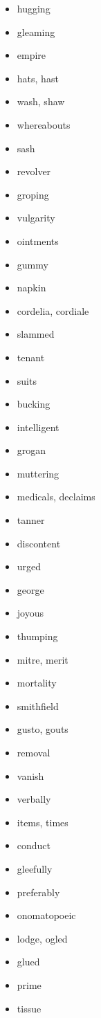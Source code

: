\documentclass{article}
\begin{document}
\begin{itemize}
    \item hugging
    \item gleaming
    \item empire
    \item hats, hast
    \item wash, shaw
    \item whereabouts
    \item sash
    \item revolver
    \item groping
    \item vulgarity
    \item ointments
    \item gummy
    \item napkin
    \item cordelia, cordiale
    \item slammed
    \item tenant
    \item suits
    \item bucking
    \item intelligent
    \item grogan
    \item muttering
    \item medicals, declaims
    \item tanner
    \item discontent
    \item urged
    \item george
    \item joyous
    \item thumping
    \item mitre, merit
    \item mortality
    \item smithfield
    \item gusto, gouts
    \item removal
    \item vanish
    \item verbally
    \item items, times
    \item conduct
    \item gleefully
    \item preferably
    \item onomatopoeic
    \item lodge, ogled
    \item glued
    \item prime
    \item tissue

\end{itemize}
\end{document}
